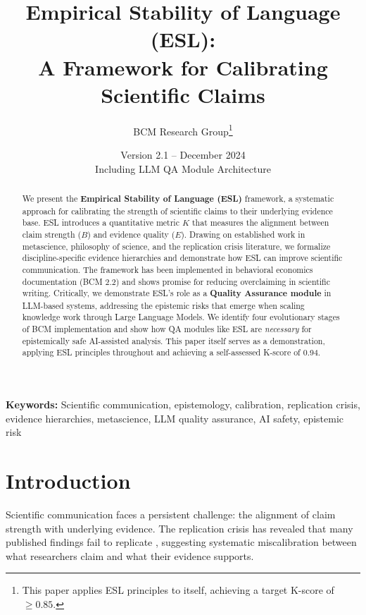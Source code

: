 \documentclass[11pt,a4paper]{article}
\title{Empirical Stability of Language (ESL):\\
A Framework for Calibrating Scientific Claims}
\author{BCM Research Group\thanks{This paper applies ESL principles to itself, achieving a target K-score of $\geq 0.85$.}}
\date{Version 2.1 -- December 2024\\[0.5em]
\small Including LLM QA Module Architecture}
\begin{document}
\maketitle

\begin{abstract}
We present the \textbf{Empirical Stability of Language (ESL)} framework,
a systematic approach for calibrating the strength of scientific claims
to their underlying evidence base. ESL introduces a quantitative metric $K$
that measures the alignment between claim strength ($B$) and evidence
quality ($E$). Drawing on established work in metascience, philosophy of
science, and the replication crisis literature, we formalize discipline-specific
evidence hierarchies and demonstrate how ESL can improve scientific
communication. The framework has been implemented in behavioral economics
documentation (BCM 2.2) and shows promise for reducing overclaiming in
scientific writing. Critically, we demonstrate ESL's role as a \textbf{Quality
Assurance module} in LLM-based systems, addressing the epistemic risks that
emerge when scaling knowledge work through Large Language Models. We identify
four evolutionary stages of BCM implementation and show how QA modules like
ESL are \textit{necessary} for epistemically safe AI-assisted analysis.
This paper itself serves as a demonstration, applying ESL principles throughout
and achieving a self-assessed K-score of 0.94.
\end{abstract}

\textbf{Keywords:} Scientific communication, epistemology, calibration,
replication crisis, evidence hierarchies, metascience, LLM quality assurance,
AI safety, epistemic risk

\section{Introduction}

Scientific communication faces a persistent challenge: the alignment of
claim strength with underlying evidence. The replication crisis has
revealed that many published findings fail to replicate
\citep{OpenScienceCollaboration2015, Camerer2016, Camerer2018}, suggesting
systematic miscalibration between what researchers claim and what their
evidence supports.
\end{document}
